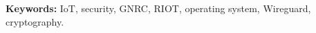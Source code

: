 \documentclass[12pt,twoside]{report}
\begin{document}
\textbf{Keywords:} IoT, security, GNRC, RIOT, operating system, Wireguard, cryptography.
\newpage

\renewcommand{\contentsname}{Table of Contents}
\tableofcontents

\listoffigures
\lstlistoflistings 
\printglossary[type=\acronymtype, title = Abbreviations, nonumberlist]
\newpage











\printbibliography[title={References}]
\end{document}
